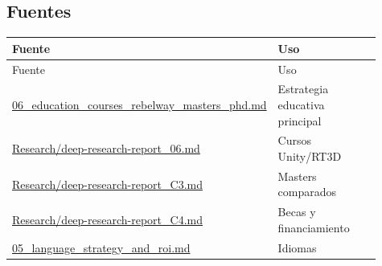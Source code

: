 \subsection{Fuentes}


\begin{center}
\scriptsize
\begin{longtable}{>{\raggedright\arraybackslash}p{0.455\linewidth} >{\raggedright\arraybackslash}p{0.455\linewidth}}
\toprule
Fuente & Uso \\
\midrule
\endfirsthead
\toprule
Fuente & Uso \\
\midrule
\endhead
\href{file:///E:/Laboral/06_education_courses_rebelway_masters_phd.md}{06\_education\_courses\_rebelway\_masters\_phd.md} & Estrategia educativa principal \\
\href{file:///E:/Laboral/Research/deep-research-report_06.md}{Research/deep-research-report\_06.md} & Cursos Unity/RT3D \\
\href{file:///E:/Laboral/Research/deep-research-report_C3.md}{Research/deep-research-report\_C3.md} & Masters comparados \\
\href{file:///E:/Laboral/Research/deep-research-report_C4.md}{Research/deep-research-report\_C4.md} & Becas y financiamiento \\
\href{file:///E:/Laboral/05_language_strategy_and_roi.md}{05\_language\_strategy\_and\_roi.md} & Idiomas \\
\bottomrule
\end{longtable}
\end{center}
